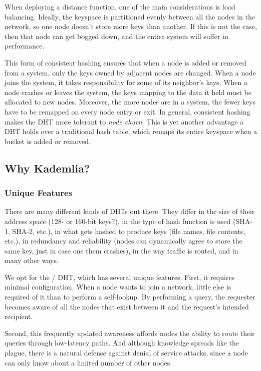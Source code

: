 \documentclass[11pt,twocolumn]{article}
\begin{document}
When deploying a distance function, one of the main considerations is load balancing.
Ideally, the keyspace is partitioned evenly between all the nodes in the network, so one node doesn't store more keys than another.
If this is not the case, then that node can get bogged down, and the entire system will suffer in performance.

This form of consistent hashing ensures that when a node is added or removed from a system, only the keys owned by adjacent nodes are changed. 
When a node joins the system, it takes responsibility for some of its neighbor's keys.
When a node crashes or leaves the system, the keys mapping to the data it held must be allocated to new nodes.
Moreover, the more nodes are in a system, the fewer keys have to be remapped on every node entry or exit.
In general, consistent hashing makes the DHT more tolerant to \emph{node churn}.
This is yet another advantage a DHT holds over a traditional hash table, which remaps its entire keyspace when a bucket is added or removed.

\subsection{Why Kademlia?}

\subsubsection{Unique Features}
There are many different kinds of DHTs out there.
They differ in the size of their address space (128- or 160-bit keys?), in the type of hash function is used (SHA-1, SHA-2, etc.), in what gets hashed to produce keys (file names, file contents, etc.), in redundancy and reliability (nodes can dynamically agree to store the same key, just in case one them crashes), in the way traffic is routed, and in many other ways.

We opt for the \Kademlia/ DHT, which has several unique features.
First, it requires minimal configuration.
When a node wants to join a network, little else is required of it than to perform a self-lookup.
By performing a query, the requester becomes aware of all the nodes that exist between it and the request's intended recipient.

Second, this frequently updated awareness affords nodes the ability to route their queries through low-latency paths.
And although knowledge spreads like the plague, there is a natural defense against denial of service attacks, since a node can only know about a limited number of other nodes.
\end{document}
